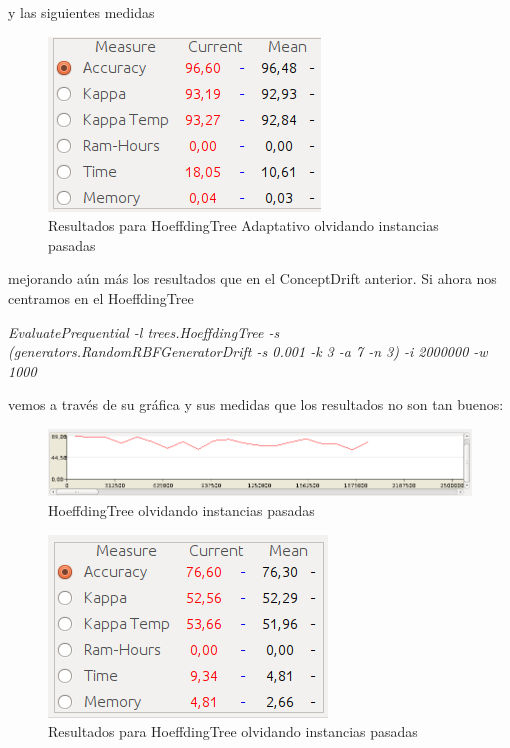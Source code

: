 y las siguientes medidas 

\begin{figure}[H] %
	\centering
	\includegraphics[scale=0.5]{measures41.png}  %
	\caption{Resultados para HoeffdingTree Adaptativo olvidando instancias pasadas} 
	\label{fig:measure41}
\end{figure}

mejorando aún más los resultados que en el ConceptDrift anterior. Si ahora nos centramos en el HoeffdingTree

\textit{EvaluatePrequential -l trees.HoeffdingTree -s (generators.RandomRBFGeneratorDrift -s 0.001 -k 3 -a 7 -n 3) -i 2000000 -w 1000}

vemos a través de su gráfica y sus medidas que los resultados no son tan buenos:

\begin{figure}[H] %
	\centering
	\includegraphics[scale=0.4]{graph42.png}  %
	\caption{HoeffdingTree olvidando instancias pasadas} 
	\label{fig:graph42}
\end{figure}

\begin{figure}[H] %
	\centering
	\includegraphics[scale=0.5]{measures42.png}  %
	\caption{Resultados para HoeffdingTree  olvidando instancias pasadas} 
	\label{fig:measure42}
\end{figure}

